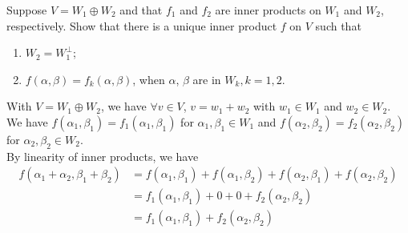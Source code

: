 \documentclass[11pt]{article}
\begin{document}
\begin{homeworkProblem}

    Suppose $V = W_1 \oplus W_2$ and that $f_1$ and $f_2$ are inner products on $W_1$ and $W_2$, respectively.
    Show that there is a unique inner product $f$ on $V$ such that
    \begin{enumerate}[label=(\alph*), topsep=5pt, itemsep=5pt]
        \item $W_2 = W_1^\perp$;
        \item $f(\alpha, \beta) = f_k(\alpha, \beta)$, when $\alpha$, $\beta$ are in $W_k, k = 1, 2$. \newline
    \end{enumerate}

    \solution

    With $V = W_1 \oplus W_2$, we have $\forall v \in V$, $v = w_1 + w_2$ with $w_1 \in W_1$ and $w_2 \in W_2$. \\

    We have $f(\alpha_1, \beta_1) = f_1(\alpha_1, \beta_1)$ for $\alpha_1, \beta_1 \in W_1$ and $f(\alpha_2, \beta_2) = f_2(\alpha_2, \beta_2)$ for $\alpha_2, \beta_2 \in W_2$. \\

    By linearity of inner products, we have
    \begin{align*}
        f(\alpha_1 + \alpha_2, \beta_1 + \beta_2) & = f(\alpha_1, \beta_1) + f(\alpha_1, \beta_2) + f(\alpha_2, \beta_1) + f(\alpha_2, \beta_2) \\
                                                  & = f_1(\alpha_1, \beta_1) + 0 + 0 + f_2(\alpha_2, \beta_2)                                   \\
                                                  & = f_1(\alpha_1, \beta_1) + f_2(\alpha_2, \beta_2)
    \end{align*}

\end{homeworkProblem}
\end{document}
